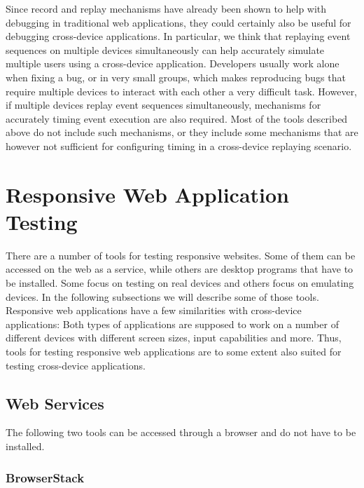 Since record and replay mechanisms have already been shown to help with debugging in traditional web applications, they could certainly also be useful for debugging cross-device applications. In particular, we think that replaying event sequences on multiple devices simultaneously can help accurately simulate multiple users using a cross-device application. Developers usually work alone when fixing a bug, or in very small groups, which makes reproducing bugs that require multiple devices to interact with each other a very difficult task. However, if multiple devices replay event sequences simultaneously, mechanisms for accurately timing event execution are also required. Most of the tools described above do not include such mechanisms, or they include some mechanisms that are however not sufficient for configuring timing in a cross-device replaying scenario.

\section{Responsive Web Application Testing}

There are a number of tools for testing responsive websites. Some of them can be accessed on the web as a service, while others are desktop programs that have to be installed. Some focus on testing on real devices and others focus on emulating devices. In the following subsections we will describe some of those tools. Responsive web applications have a few similarities with cross-device applications: Both types of applications are supposed to work on a number of different devices with different screen sizes, input capabilities and more. Thus, tools for testing responsive web applications are to some extent also suited for testing cross-device applications.

\subsection{Web Services}

The following two tools can be accessed through a browser and do not have to be installed.

\subsubsection{BrowserStack}

